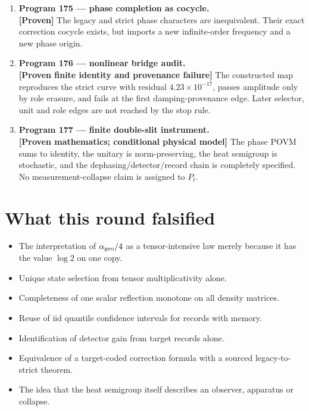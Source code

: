 \documentclass[11pt,a4paper,openany]{report}
\newcommand{\statusProven}{\textcolor{fingreen}{[Proven]}}
\begin{document}
\begin{enumerate}
\item 
\textbf{Program 175 --- phase completion as cocycle.}\\
\textbf{\statusProven{}} The legacy and strict phase characters are inequivalent. Their exact correction cocycle exists, but imports a new infinite-order frequency and a new phase origin.

\item 
\textbf{Program 176 --- nonlinear bridge audit.}\\
\textbf{[Proven finite identity and provenance failure]} The constructed map reproduces the strict curve with residual \(4.23\times10^{-17}\), passes amplitude only by role erasure, and fails at the first damping-provenance edge. Later selector, unit and role edges are not reached by the stop rule.

\item 
\textbf{Program 177 --- finite double-slit instrument.}\\
\textbf{[Proven mathematics; conditional physical model]} The phase POVM sums to identity, the unitary is norm-preserving, the heat semigroup is stochastic, and the dephasing/\allowbreak{}detector/\allowbreak{}record chain is completely specified. No measurement-collapse claim is assigned to \(P_t\).

\end{enumerate}

\section{What this round falsified}

\begin{itemize}
\item 
The interpretation of \(\alpha_{\rm geo}/4\) as a tensor-intensive law merely because it has the value \(\log2\) on one copy.

\item 
Unique state selection from tensor multiplicativity alone.

\item 
Completeness of one scalar reflection monotone on all density matrices.

\item 
Reuse of iid quantile confidence intervals for records with memory.

\item 
Identification of detector gain from target records alone.

\item 
Equivalence of a target-coded correction formula with a sourced legacy-to-strict theorem.

\item 
The idea that the heat semigroup itself describes an observer, apparatus or collapse.

\end{itemize}
\end{document}
